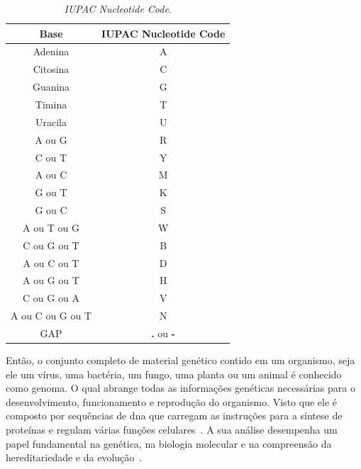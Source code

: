 \begin{table}[htb]
  \caption{\textit{IUPAC Nucleotide Code}.}
  \begin{center}
    \begin{tabular}{c|c}
      \hline
      Base             & IUPAC Nucleotide Code    \\
      \hline
      Adenina          & A                        \\
      Citosina         & C                        \\
      Guanina          & G                        \\
      Timina           & T                        \\
      Uracila          & U                        \\
      A ou G           & R                        \\
      C ou T           & Y                        \\
      A ou C           & M                        \\
      G ou T           & K                        \\
      G ou C           & S                        \\
      A ou T ou G      & W                        \\
      C ou G ou T      & B                        \\
      A ou C ou T      & D                        \\
      A ou G ou T      & H                        \\
      C ou G ou A      & V                        \\
      A ou C ou G ou T & N                        \\
      GAP              & \textbf{.} ou \textbf{-} \\
      \hline
    \end{tabular}
  \end{center}
  \label{tab:iupacNucleotideCode}
\end{table}

Então, o conjunto completo de material genético contido em um organismo, seja ele um vírus, uma bactéria, um fungo, uma planta ou um animal é conhecido como genoma. O qual abrange todas as informações genéticas necessárias para o desenvolvimento, funcionamento e reprodução do organismo. Visto que ele é composto por sequências de \gls{dna} que carregam as instruções para a síntese de proteínas e regulam várias funções celulares~\cite{alberts_biologia_2017,genetics_benjamin_2016}. A sua análise desempenha um papel fundamental na genética, na biologia molecular e na compreensão da hereditariedade e da evolução~\cite{alberts_biologia_2017}.

